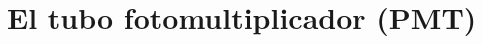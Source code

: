 \documentclass{beamer}
\begin{document}
%
%

\section{El tubo fotomultiplicador (PMT)}
\end{document}
